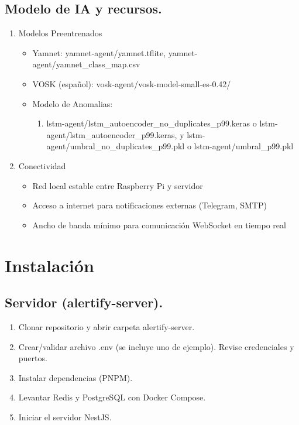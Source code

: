 \subsection*{Modelo de IA y recursos.}

\begin{enumerate}
  \item Modelos Preentrenados
        \begin{itemize}
          \item Yamnet: yamnet-agent/yamnet.tflite, yamnet-agent/yamnet\_class\_map.csv
          \item VOSK (español): vosk-agent/vosk-model-small-es-0.42/
          \item Modelo de Anomalias:
                \begin{enumerate}
                  \item lstm-agent/lstm\_autoencoder\_no\_duplicates\_p99.keras o lstm-agent/lstm\_autoencoder\_p99.keras, y lstm-agent/umbral\_no\_duplicates\_p99.pkl o lstm-agent/umbral\_p99.pkl
                \end{enumerate}
        \end{itemize}
  \item Conectividad
        \begin{itemize}
          \item Red local estable entre Raspberry Pi y servidor
          \item Acceso a internet para notificaciones externas (Telegram, SMTP)
          \item Ancho de banda mínimo para comunicación WebSocket en tiempo real
        \end{itemize}
\end{enumerate}

\section*{Instalación}

\subsection*{Servidor (alertify-server).}

\begin{enumerate}
  \item Clonar repositorio y abrir carpeta alertify-server.
  \item Crear/validar archivo .env  (se incluye uno de ejemplo). Revise credenciales y puertos.
  \item Instalar dependencias (PNPM).
  \item Levantar Redis y PostgreSQL con Docker Compose.
  \item Iniciar el servidor NestJS.
\end{enumerate}

